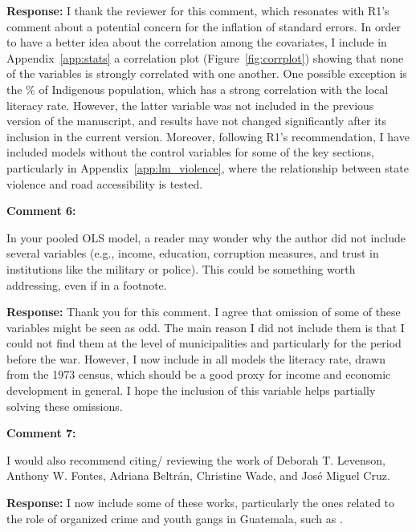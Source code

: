 \documentclass[12pt, a4paper, notitlepage]{article}
\begin{document}
\noindent\textbf{Response:} I thank the reviewer for this comment, which resonates with R1's comment about a potential concern for the inflation of standard errors. In order to have a better idea about the correlation among the covariates, I include in Appendix~\ref{app:stats} a correlation plot (Figure~\ref{fig:corrplot}) showing that none of the variables is strongly correlated with one another. One possible exception is the \% of Indigenous population, which has a strong correlation with the local literacy rate. However, the latter variable was not included in the previous version of the manuscript, and results have not changed significantly after its inclusion in the current version.
Moreover, following R1's recommendation, I have included models without the control variables for some of the key sections, particularly in Appendix~\ref{app:lm_violence}, where the relationship between state violence and road accessibility is tested.

\vspace{15pt}
\noindent\textbf{Comment 6:}
\begin{displayquote}
In your pooled OLS model, a reader may wonder why the author did not include several variables (e.g., income, education, corruption measures, and trust in institutions like the military or police). This could be something worth addressing, even if in a footnote.
\end{displayquote}

\noindent\textbf{Response:} Thank you for this comment. I agree that omission of some of these variables might be seen as odd. The main reason I did not include them is that I could not find them at the level of municipalities and particularly for the period before the war. However, I now include in all models the literacy rate, drawn from the 1973 census, which should be a good proxy for income and economic development in general. I hope the inclusion of this variable helps partially solving these omissions.

\vspace{15pt}
\noindent\textbf{Comment 7:}
\begin{displayquote}
I would also recommend citing/ reviewing the work of Deborah T. Levenson, Anthony W. Fontes, Adriana Beltrán, Christine Wade, and José Miguel Cruz.
\end{displayquote}

\noindent\textbf{Response:} I now include some of these works, particularly the ones related to the role of organized crime and youth gangs in Guatemala, such as \citet{Peacock:2003tt, Beltran:2016td, Booth:2010wd, Levenson:2013tm}.

\newpage


\end{document}
